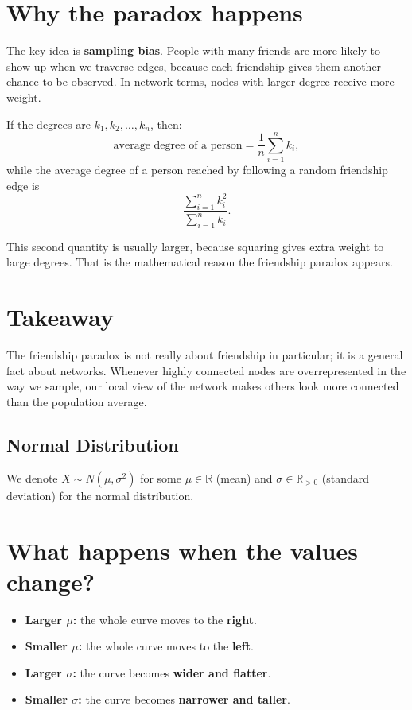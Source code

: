 \begin{eg}
\section*{Why the paradox happens}

The key idea is \textbf{sampling bias}. People with many friends are more likely to show
up when we traverse edges, because each friendship gives them another chance to be
observed. In network terms, nodes with larger degree receive more weight.

If the degrees are $k_1, k_2, \dots, k_n$, then:
\[
\text{average degree of a person} = \frac{1}{n}\sum_{i=1}^n k_i,
\]
while the average degree of a person reached by following a random friendship edge is
\[
\frac{\sum_{i=1}^n k_i^2}{\sum_{i=1}^n k_i}.
\]

This second quantity is usually larger, because squaring gives extra weight to large
degrees. That is the mathematical reason the friendship paradox appears.

\section*{Takeaway}

The friendship paradox is not really about friendship in particular; it is a general fact
about networks. Whenever highly connected nodes are overrepresented in the way we sample,
our local view of the network makes others look more connected than the population average.
\end{eg}

\subsection{Normal Distribution}
We denote \(X \sim N(\mu , \sigma ^2)\) for some \(\mu \in \mathbb{R}\) (mean) and \(\sigma \in \mathbb{R} _{> 0}\) (standard deviation) for the normal distribution. 

\section*{What happens when the values change?}

\begin{itemize}[leftmargin=1.5em]
    \item \textbf{Larger $\mu$:} the whole curve moves to the \textbf{right}.
    \item \textbf{Smaller $\mu$:} the whole curve moves to the \textbf{left}.
    \item \textbf{Larger $\sigma$:} the curve becomes \textbf{wider and flatter}.
    \item \textbf{Smaller $\sigma$:} the curve becomes \textbf{narrower and taller}.
\end{itemize}

